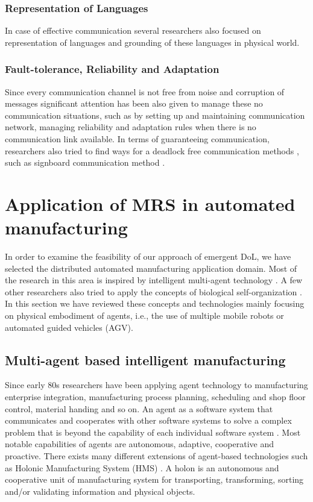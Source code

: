 \subsubsection*{Representation of Languages}
In case of effective communication several researchers also focused on representation of languages and grounding of these languages in physical world.

\subsubsection*{Fault-tolerance, Reliability and Adaptation}  
Since every communication channel is not free from noise and corruption of messages significant attention has been also given to manage these no communication situations, such as by setting up and maintaining communication network, managing reliability and adaptation rules when there is no communication link available. In terms of guaranteeing communication, researchers also tried to find ways for a deadlock free communication methods \cite{Arkin1998}, such as signboard communication method \cite{Wang1989}.

\section{Application of MRS in automated manufacturing}
In order to examine the feasibility of our approach of emergent DoL, we have selected the distributed automated manufacturing application domain. Most of the research in this area is inspired by intelligent multi-agent technology \cite{Shen+2001}. A few other researchers also tried to apply the concepts of biological self-organization  \cite{Ueda2006,Lazinica+2007}. In this section we have reviewed these concepts and technologies mainly focusing on physical embodiment of agents, i.e., the use of multiple mobile robots or automated guided vehicles (AGV).
%
\subsection{Multi-agent based intelligent manufacturing}
Since early 80s researchers have been applying agent technology to manufacturing enterprise integration,  manufacturing process planning, scheduling and shop floor control, material handing and so on\cite{Shen+2006}. An agent as a software system that communicates and cooperates with other software systems to solve a complex problem that is beyond the capability of each individual software system \cite{Shen+2001}. Most notable capabilities of agents are autonomous, adaptive, cooperative and proactive. There exists many different extensions of agent-based technologies such as Holonic Manufacturing System (HMS) \cite{Bussmann+2004}. A holon is an autonomous and cooperative unit of manufacturing system for transporting, transforming, sorting and/or validating information and physical objects. 

